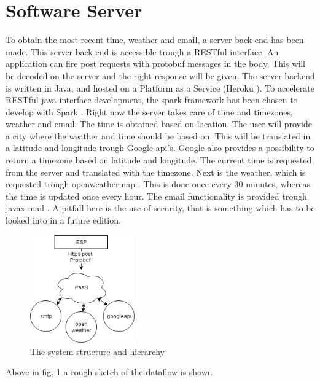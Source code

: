 \section{Software Server}
To obtain the most recent time, weather and email, a server back-end has been made. This server back-end is accessible trough a RESTful interface. An application can fire post requests with protobuf messages in the body. This will be decoded on the server and the right response will be given. The server backend is written in Java, and hosted on a Platform as a Service (Heroku \cite{other:heroku}). To accelerate RESTful java interface development, the spark framework has been chosen to develop with Spark \cite{other:spark}. Right now the server takes care of time and timezones, weather and email. The time is obtained based on location. The user will provide a city where the weather and time should be based on. This will be translated in a latitude and longitude trough Google api's. Google also provides a possibility to return a timezone based on latitude and longitude. The current time is requested from the server and translated with the timezone. Next is the weather, which is requested trough openweathermap \cite{other:weathermaps}. This is done once every 30 minutes, whereas the time is updated once every hour. The email functionality is provided trough javax mail \cite{other:javax}. A pitfall here is the use of security, that is something which has to be looked into in a future edition.
\begin{figure}[H]
	\centering
	\label{fig:block_server}
	\includegraphics[width=0.4\textwidth]{fig/block_server.png}
	\caption{The system structure and hierarchy}
\end{figure}
Above in fig. \ref{fig:block_server} a rough sketch of the dataflow is shown
